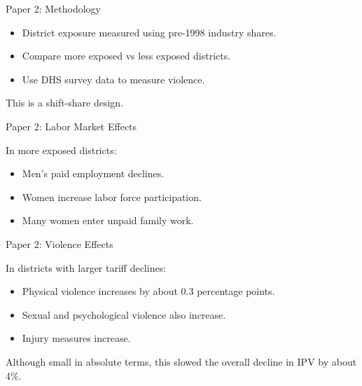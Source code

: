 \documentclass[11pt,aspectratio=169]{beamer}
\begin{document}
\begin{frame}{Paper 2: Methodology}

\begin{itemize}
    \item District exposure measured using pre-1998 industry shares.
    \item Compare more exposed vs less exposed districts.
    \item Use DHS survey data to measure violence.
\end{itemize}

\medskip

This is a shift-share design.

\end{frame}

\begin{frame}{Paper 2: Labor Market Effects}

In more exposed districts:

\begin{itemize}
    \item Men’s paid employment declines.
    \item Women increase labor force participation.
    \item Many women enter unpaid family work.
\end{itemize}

\end{frame}

\begin{frame}{Paper 2: Violence Effects}

In districts with larger tariff declines:

\begin{itemize}
    \item Physical violence increases by about 0.3 percentage points.
    \item Sexual and psychological violence also increase.
    \item Injury measures increase.
\end{itemize}

\medskip

Although small in absolute terms,
this slowed the overall decline in IPV by about 4\%.

\end{frame}
\end{document}
